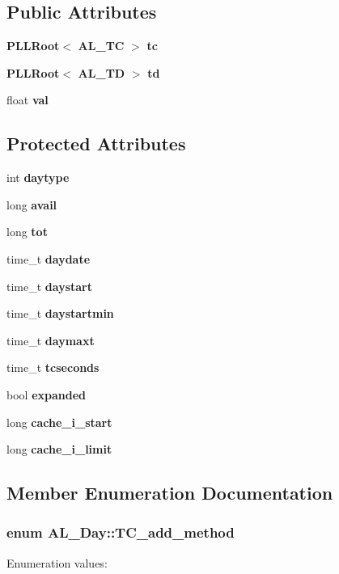 \subsection*{Public Attributes}
\begin{CompactItemize}
\item 
{\bf PLLRoot}$<$ {\bf AL\_\-TC} $>$ {\bf tc}
\item 
{\bf PLLRoot}$<$ {\bf AL\_\-TD} $>$ {\bf td}
\item 
float {\bf val}
\end{CompactItemize}
\subsection*{Protected Attributes}
\begin{CompactItemize}
\item 
int {\bf daytype}
\item 
long {\bf avail}
\item 
long {\bf tot}
\item 
time\_\-t {\bf daydate}
\item 
time\_\-t {\bf daystart}
\item 
time\_\-t {\bf daystartmin}
\item 
time\_\-t {\bf daymaxt}
\item 
time\_\-t {\bf tcseconds}
\item 
bool {\bf expanded}
\item 
long {\bf cache\_\-i\_\-start}
\item 
long {\bf cache\_\-i\_\-limit}
\end{CompactItemize}


\subsection{Member Enumeration Documentation}
\subsubsection{\setlength{\rightskip}{0pt plus 5cm}enum AL\_\-Day::TC\_\-add\_\-method}\label{classAL__Day_s3}


\begin{Desc}
\item[Enumeration values:]\par
\begin{description}
\item[{\em 
{\em TAIL\_\-REPLACE}\label{classAL__Day_s3s0}
}]\item[{\em 
{\em RANDOM}\label{classAL__Day_s3s1}
}]\item[{\em 
{\em BEFORE\_\-HEAD}\label{classAL__Day_s3s2}
}]\end{description}
\end{Desc}




